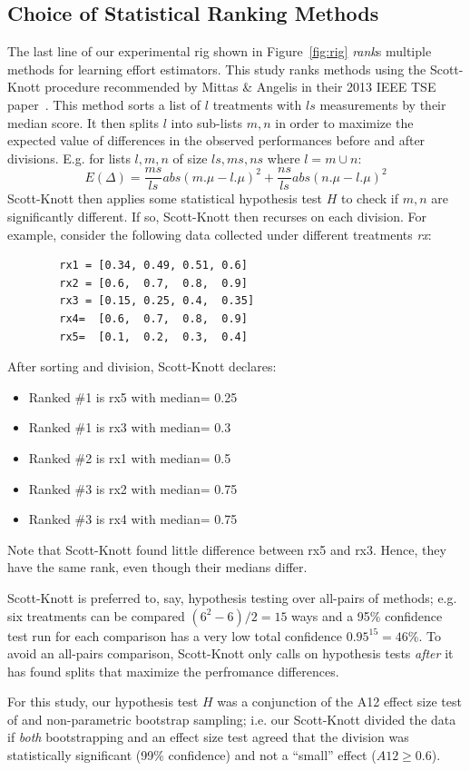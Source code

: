 \documentclass{sig-alternate}
\newcommand{\bi}{\begin{itemize}[leftmargin=0.4cm]}
\newcommand{\ei}{\end{itemize}}
\newcommand{\fig}[1]{Figure~\ref{fig:#1}}
\begin{document}
\subsection{Choice of Statistical Ranking Methods}\label{sect:stats}
The last line of our experimental rig shown in
\fig{rig} {\em rank}s multiple methods for learning
effort estimators.
This study ranks methods using the Scott-Knott
procedure recommended by Mittas \& Angelis in their 2013
IEEE TSE paper~\cite{mittas13}.  This method
sorts a list of $l$ treatments with $ls$ measurements by their median
score. It then
splits $l$ into sub-lists $m,n$ in order to maximize the expected value of
 differences  in the observed performances
before and after divisions. E.g. for lists $l,m,n$ of size $ls,ms,ns$ where $l=m\cup n$:
 \[E(\Delta)=\frac{ms}{ls}abs(m.\mu - l.\mu)^2 + \frac{ns}{ls}abs(n.\mu - l.\mu)^2\]
Scott-Knott then applies some statistical hypothesis test $H$ to check
if $m,n$ are significantly different. If so, Scott-Knott then recurses on each division.
For example, consider the following data collected under different treatments {\em rx}:

{\scriptsize \begin{verbatim}
        rx1 = [0.34, 0.49, 0.51, 0.6]
        rx2 = [0.6,  0.7,  0.8,  0.9]
        rx3 = [0.15, 0.25, 0.4,  0.35]
        rx4=  [0.6,  0.7,  0.8,  0.9]
        rx5=  [0.1,  0.2,  0.3,  0.4]
\end{verbatim}}
\noindent
After sorting and division, Scott-Knott declares:
\bi
\item Ranked \#1 is rx5 with median= 0.25
\item Ranked \#1 is rx3 with median= 0.3
\item Ranked \#2 is rx1 with median= 0.5
\item Ranked \#3 is rx2 with median= 0.75
\item Ranked \#3 is rx4 with median= 0.75
\ei
Note that Scott-Knott found  little
difference between rx5 and rx3. Hence,
they have the same rank, even though their medians differ.

Scott-Knott is preferred to, say, hypothesis testing
over all-pairs of methods; e.g. six treatments
can be compared $(6^2-6)/2=15$ ways and 
a 95\% confidence test run for each comparison has  a very low total confidence 
$0.95^{15} = 46$\%.
To avoid an all-pairs comparison, Scott-Knott only calls on hypothesis
tests {\em after} it has found splits that maximize the perfromance differences.
 
For this study, our hypothesis test $H$ was a
conjunction of the A12 effect size test of  and
non-parametric bootstrap sampling; i.e. our
Scott-Knott divided the data if {\em both}
bootstrapping and an effect size test agreed that
the division was statistically significant (99\%
confidence) and not a ``small'' effect ($A12 \ge
0.6$).
\end{document}
